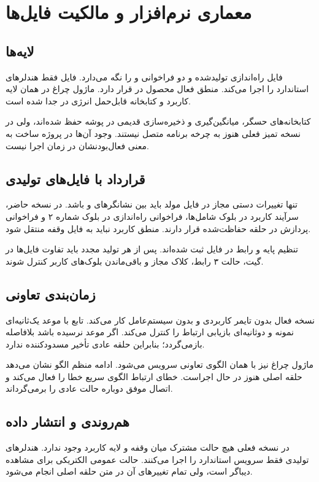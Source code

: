 \chapter{معماری نرم‌افزار و مالکیت فایل‌ها}

\section{لایه‌ها}
فایل
راه‌اندازی تولیدشده و دو فراخوانی
و
را نگه می‌دارد. فایل
فقط هندلرهای استاندارد
را اجرا می‌کند. منطق فعال محصول در
قرار دارد. ماژول چراغ در همان لایه کاربرد و کتابخانه قابل‌حمل انرژی در
جدا شده است.

کتابخانه‌های حسگر، میانگین‌گیری و ذخیره‌سازی قدیمی در پوشه
حفظ شده‌اند، ولی در نسخه تمیز فعلی هنوز به چرخه برنامه متصل نیستند. وجود آن‌ها در پروژه ساخت به معنی فعال‌بودنشان در زمان اجرا نیست.

\section{قرارداد با فایل‌های تولیدی}
تنها تغییرات دستی مجاز در فایل مولد باید بین نشانگرهای
و
باشد. در نسخه حاضر، سرآیند کاربرد در بلوک شامل‌ها، فراخوانی راه‌اندازی در بلوک شماره ۲ و فراخوانی پردازش در حلقه حفاظت‌شده قرار دارند. منطق کاربرد نباید به فایل وقفه منتقل شود.

تنظیم پایه
و رابط
در فایل
ثبت شده‌اند. پس از هر تولید مجدد باید تفاوت فایل‌ها در گیت، حالت ۳ رابط، کلاک مجاز و باقی‌ماندن بلوک‌های کاربر کنترل شوند.

\section{زمان‌بندی تعاونی}
نسخه فعال بدون تایمر کاربردی و بدون سیستم‌عامل کار می‌کند. تابع
با
موعد یک‌ثانیه‌ای نمونه و دوثانیه‌ای بازیابی ارتباط را کنترل می‌کند. اگر موعد نرسیده باشد بلافاصله بازمی‌گردد؛ بنابراین حلقه عادی تأخیر مسدودکننده ندارد.

ماژول چراغ نیز با همان الگوی تعاونی سرویس می‌شود. ادامه منظم الگو نشان می‌دهد حلقه اصلی هنوز در حال اجراست. خطای ارتباط
الگوی سریع خطا را فعال می‌کند و اتصال موفق دوباره حالت عادی را برمی‌گرداند.

\section{هم‌روندی و انتشار داده}
در نسخه فعلی هیچ حالت مشترک میان وقفه و لایه کاربرد وجود ندارد. هندلرهای تولیدی فقط سرویس استاندارد
را اجرا می‌کنند. حالت عمومی الکتریکی برای مشاهده دیباگر
است، ولی تمام تغییرهای آن در متن حلقه اصلی انجام می‌شود.


